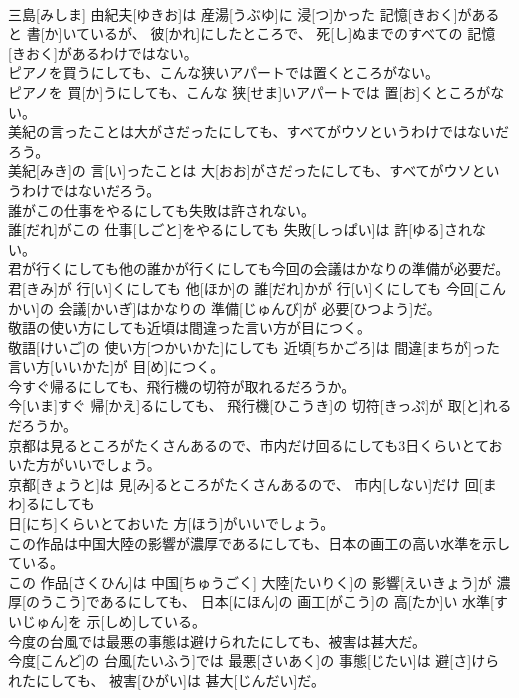 \documentclass[8pt]{extreport}
\begin{document}
\begin{CJK}{UTF8}{min}
\\	三島[みしま] 由紀夫[ゆきお]は 産湯[うぶゆ]に 浸[つ]かった 記憶[きおく]があると 書[か]いているが、 彼[かれ]にしたところで、 死[し]ぬまでのすべての 記憶[きおく]があるわけではない。
\\	ピアノを買うにしても、こんな狭いアパートでは置くところがない。	
\\	ピアノを 買[か]うにしても、こんな 狭[せま]いアパートでは 置[お]くところがない。
\\	美紀の言ったことは大がさだったにしても、すべてがウソというわけではないだろう。	
\\	美紀[みき]の 言[い]ったことは 大[おお]がさだったにしても、すべてがウソというわけではないだろう。
\\	誰がこの仕事をやるにしても失敗は許されない。	
\\	誰[だれ]がこの 仕事[しごと]をやるにしても 失敗[しっぱい]は 許[ゆる]されない。
\\	君が行くにしても他の誰かが行くにしても今回の会議はかなりの準備が必要だ。	
\\	君[きみ]が 行[い]くにしても 他[ほか]の 誰[だれ]かが 行[い]くにしても 今回[こんかい]の 会議[かいぎ]はかなりの 準備[じゅんび]が 必要[ひつよう]だ。
\\	敬語の使い方にしても近頃は間違った言い方が目につく。	
\\	敬語[けいご]の 使い方[つかいかた]にしても 近頃[ちかごろ]は 間違[まちが]った 言い方[いいかた]が 目[め]につく。
\\	今すぐ帰るにしても、飛行機の切符が取れるだろうか。	
\\	今[いま]すぐ 帰[かえ]るにしても、 飛行機[ひこうき]の 切符[きっぷ]が 取[と]れるだろうか。
\\	京都は見るところがたくさんあるので、市内だけ回るにしても3日くらいとておいた方がいいでしょう。	
\\	京都[きょうと]は 見[み]るところがたくさんあるので、 市内[しない]だけ 回[まわ]るにしても 
\\	日[にち]くらいとておいた 方[ほう]がいいでしょう。
\\	この作品は中国大陸の影響が濃厚であるにしても、日本の画工の高い水準を示している。	
\\	この 作品[さくひん]は 中国[ちゅうごく] 大陸[たいりく]の 影響[えいきょう]が 濃厚[のうこう]であるにしても、 日本[にほん]の 画工[がこう]の 高[たか]い 水準[すいじゅん]を 示[しめ]している。
\\	今度の台風では最悪の事態は避けられたにしても、被害は甚大だ。	
\\	今度[こんど]の 台風[たいふう]では 最悪[さいあく]の 事態[じたい]は 避[さ]けられたにしても、 被害[ひがい]は 甚大[じんだい]だ。

\end{CJK}
\end{document}
